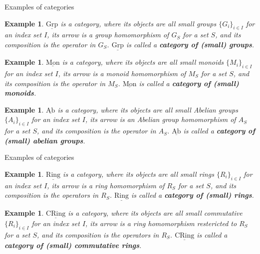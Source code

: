 \documentclass[dvipdfmx,10pt,notheorems]{beamer}
\newtheorem{example}[theorem]{Example}
\renewcommand{\#}{^\sharp}
\begin{document}
	\begin{frame}{Examples of categories}
			\begin{example}
			$\underline{\mathrm{Grp}}$ is a category, where its objects are all small groups $\{G_i\}_{i\in I}$ for an index set $I$,
			its arrow is a group homomorphism of $G_S$ for a set $S$,
			and its composition is the operator in $G_S$.
			$\underline{\mathrm{Grp}}$ is called a {\bf category of (small) groups}.
			\end{example}
			\begin{example}
			$\underline{\mathrm{Mon}}$ is a category, where its objects are all small monoids $\{M_i\}_{i\in I}$ for an index set $I$,
			its arrow is a monoid homomorphism of $M_S$ for a set $S$,
			and its composition is the operator in $M_S$.
			$\underline{\mathrm{Mon}}$ is called a {\bf category of (small) monoids}.
			\end{example}
			\begin{example}
			$\underline{\mathrm{Ab}}$ is a category, where its objects are all small Abelian groups $\{A_i\}_{i\in I}$ for an index set $I$,
			its arrow is an Abelian group homomorphism of $A_S$ for a set $S$,
			and its composition is the operator in $A_S$.
			$\underline{\mathrm{Ab}}$ is called a {\bf category of (small) abelian groups}.
			\end{example}
	\end{frame}
	
	
	
	\begin{frame}{Examples of categories}
			\begin{example}
			$\underline{\mathrm{Ring}}$ is a category, where its objects are all small rings $\{R_i\}_{i\in I}$ for an index set $I$,
			its arrow is a ring homomorphism of $R_S$ for a set $S$,
			and its composition is the operators in $R_S$.
			$\underline{\mathrm{Ring}}$ is called a {\bf category of (small) rings}.
			\end{example}
			\begin{example}
			$\underline{\mathrm{CRing}}$ is a category, where its objects are all small commutative $\{R_i\}_{i\in I}$ for an index set $I$,
			its arrow is a ring homomorphism restericted to $R_S$ for a set $S$,
			and its composition is the operators in $R_S$.
			$\underline{\mathrm{CRing}}$ is called a {\bf category of (small) commutative rings}.
			\end{example}
	\end{frame}
	
	
	
\end{document}
